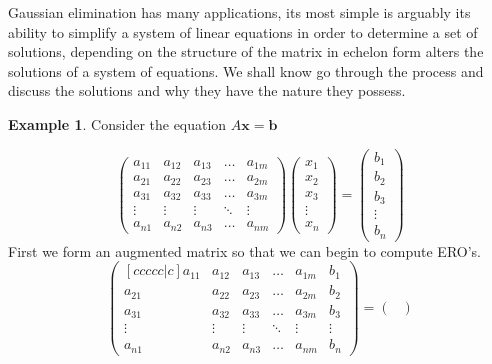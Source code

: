 \documentclass[12pt,reqno,twoside,titlepage]{article}
\theoremstyle{definition}
\newtheorem{exmp}{Example}[section]
\begin{document}
Gaussian elimination has many applications, its most simple is arguably its ability to simplify a system of linear equations in order to determine a set of solutions, depending on the structure of the matrix in echelon form alters the solutions of a system of equations. We shall know go through the process and discuss the solutions and why they have the nature they possess. \begin{exmp}
Consider the equation $A\textbf{x} = \textbf{b}$

\begin{equation*}
    \begin{pmatrix}
    a_{11} & a_{12} & a_{13} & \dots & a_{1m} \\
    a_{21} & a_{22} & a_{23} & \dots & a_{2m} \\
    a_{31} & a_{32} & a_{33} & \dots & a_{3m} \\
    \vdots & \vdots & \vdots & \ddots & \vdots \\
    a_{n1} & a_{n2} & a_{n3} & \dots & a_{nm}
    \end{pmatrix}
    \begin{pmatrix}
    x_{1} \\
    x_{2} \\
    x_{3} \\
    \vdots \\
    x_{n}
    \end{pmatrix}
    =
    \begin{pmatrix}
    b_{1} \\
    b_{2} \\
    b_{3} \\
    \vdots \\
    b_{n}
    \end{pmatrix}
\end{equation*}
\newline
First we form an augmented matrix so that we can begin to compute ERO’s.
\begin{equation*}
\begin{pmatrix}[ccccc|c]
a_{11} & a_{12} & a_{13} & \dots & a_{1m} & b_{1} \\
a_{21} & a_{22} & a_{23} & \dots & a_{2m} & b_{2} \\
a_{31} & a_{32} & a_{33} & \dots & a_{3m} & b_{3} \\
\vdots & \vdots & \vdots & \ddots & \vdots & \vdots \\
a_{n1} & a_{n2} & a_{n3} & \dots & a_{nm} & b_{n}
\end{pmatrix}
=
\begin{pmatrix}

\end{pmatrix}
\end{equation*}
\end{exmp}
\end{document}
